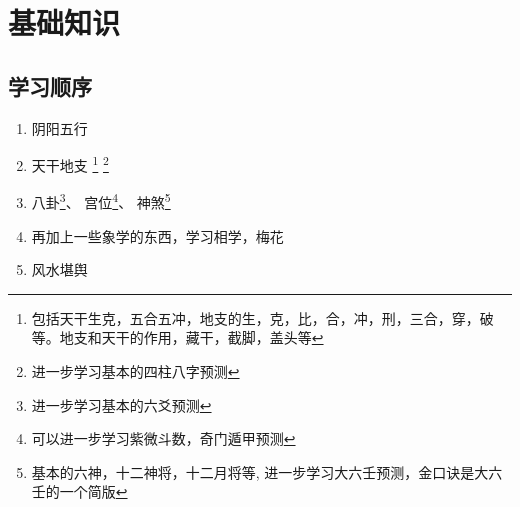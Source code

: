 \chapter{基础知识}
\section{学习顺序}
\begin{enumerate}
  \item 阴阳五行
  \item 天干地支
    \footnote{包括天干生克，五合五冲，地支的生，克，比，合，冲，刑，三合，穿，破等。地支和天干的作用，藏干，截脚，盖头等}
    \footnote{进一步学习基本的四柱八字预测}
  \item 八卦\footnote{进一步学习基本的六爻预测}、
    宫位\footnote{可以进一步学习紫微斗数，奇门遁甲预测}、
    神煞\footnote{基本的六神，十二神将，十二月将等, 进一步学习大六壬预测，金口诀是大六壬的一个简版}
  \item 再加上一些象学的东西，学习相学，梅花
  \item 风水堪舆
\end{enumerate}










